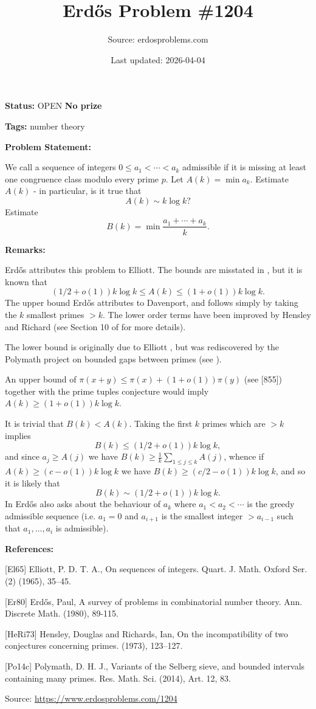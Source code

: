 \documentclass{article}
\title{Erd\H{o}s Problem \#1204}
\date{Last updated: 2026-04-04}
\author{Source: erdosproblems.com}
\begin{document}
\maketitle

\noindent\textbf{Status:} OPEN \quad \textbf{No prize}

\noindent\textbf{Tags:} number theory

\medskip
\noindent\textbf{Problem Statement:}

We call a sequence of integers $0\leq a_1<\cdots <a_k$ admissible if it is missing at least one congruence class modulo every prime $p$. Let $A(k)=\min a_k$. Estimate $A(k)$ - in particular, is it true that\[A(k)\sim k\log k?\]Estimate\[B(k)=\min \frac{a_1+\cdots+a_k}{k}.\]

\bigskip
\noindent\textbf{Remarks:}

Erd\H{o}s \cite{Er80} attributes this problem to Elliott. The bounds are misstated in \cite{Er80}, but it is known that\[(1/2+o(1))k\log k \leq A(k)\leq (1+o(1))k\log k.\]The upper bound Erd\H{o}s attributes to Davenport, and follows simply by taking the $k$ smallest primes $>k$. The lower order terms have been improved by Hensley and Richard \cite{HeRi73} (see Section 10 of \cite{Po14c} for more details).

The lower bound is originally due to Elliott \cite{El65}, but was rediscovered by the Polymath project on bounded gaps between primes (see \cite{Po14c}).

An upper bound of $\pi(x+y)\leq \pi(x)+(1+o(1))\pi(y)$ (see [855]) together with the prime tuples conjecture would imply $A(k)\geq (1+o(1))k\log k$.

It is trivial that $B(k)<A(k)$. Taking the first $k$ primes which are $>k$ implies\[B(k)\leq (1/2+o(1))k\log k,\]and since $a_j\geq A(j)$ we have $B(k) \geq \frac{1}{k}\sum_{1\leq j\leq k}A(j)$, whence if $A(k)\geq (c-o(1))k\log k$ we have $B(k) \geq (c/2-o(1))k\log k$, and so it is likely that\[B(k)\sim(1/2+o(1))k\log k.\]In \cite{Er80} Erd\H{o}s also asks about the behaviour of $a_k$ where $a_1<a_2<\cdots$ is the greedy admissible sequence (i.e. $a_1=0$ and $a_{i+1}$ is the smallest integer $>a_{i-1}$ such that $a_1,\ldots,a_i$ is admissible).

\bigskip
\noindent\textbf{References:}

[El65] Elliott, P. D. T. A., On sequences of integers. Quart. J. Math. Oxford Ser. (2) (1965), 35--45.
 
 [Er80] Erd\H{o}s, Paul, A survey of problems in combinatorial number theory. Ann. Discrete Math. (1980), 89-115.
 
 [HeRi73] Hensley, Douglas and Richards, Ian, On the incompatibility of two conjectures concerning primes. (1973), 123--127.
 
 [Po14c] Polymath, D. H. J., Variants of the Selberg sieve, and bounded intervals
containing many primes. Res. Math. Sci. (2014), Art. 12, 83.

\bigskip
\noindent\small{Source: \url{https://www.erdosproblems.com/1204}}
\end{document}
